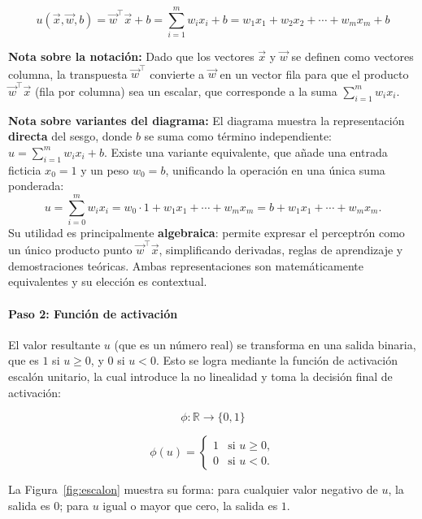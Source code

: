 \begin{equation}
\label{eq:perceptron-u}
u(\vec{x}, \vec{w}, b) = \vec{w}^\top \vec{x} + b = \sum_{i=1}^{m} w_i x_i + b = w_1 x_1 + w_2 x_2 + \cdots + w_m x_m + b
\end{equation}

\textbf{Nota sobre la notación:} Dado que los vectores $\vec{x}$ y $\vec{w}$ se definen como vectores columna, la transpuesta $\vec{w}^\top$ convierte a $\vec{w}$ en un vector fila para que el producto $\vec{w}^\top \vec{x}$ (fila por columna) sea un escalar, que corresponde a la suma $\sum_{i=1}^{m} w_i x_i$.

\textbf{Nota sobre variantes del diagrama:} El diagrama muestra la representación \textbf{directa} del sesgo, donde $b$ se suma como término independiente: $u = \sum_{i=1}^{m} w_i x_i + b$. Existe una variante equivalente, que añade una entrada ficticia $x_0 = 1$ y un peso $w_0 = b$, unificando la operación en una única suma ponderada:
\[
u = \sum_{i=0}^{m} w_i x_i = w_0 \cdot 1 + w_1 x_1 + \cdots + w_m x_m = b + w_1 x_1 + \cdots + w_m x_m.
\]
Su utilidad es principalmente \textbf{algebraica}: permite expresar el perceptrón como un único producto punto $\vec{w}^\top \vec{x}$, simplificando derivadas, reglas de aprendizaje y demostraciones teóricas. Ambas representaciones son matemáticamente equivalentes y su elección es contextual.

\paragraph{Paso 2: Función de activación}
El valor resultante $u$ (que es un número real) se transforma en una salida binaria, que es $1$ si $u \geq 0$, y $0$ si $u < 0$. Esto se logra mediante la función de activación escalón unitario, la cual introduce la no linealidad y toma la decisión final de activación:

$$\phi: \mathbb{R} \to \{0,1\}$$

\begin{equation}
\phi(u) = 
\begin{cases} 
1 & \text{si } u \geq 0, \\
0 & \text{si } u < 0.
\end{cases}
\end{equation}

La Figura~\ref{fig:escalon} muestra su forma: para cualquier valor negativo de $u$, la salida es $0$; para $u$ igual o mayor que cero, la salida es $1$.

